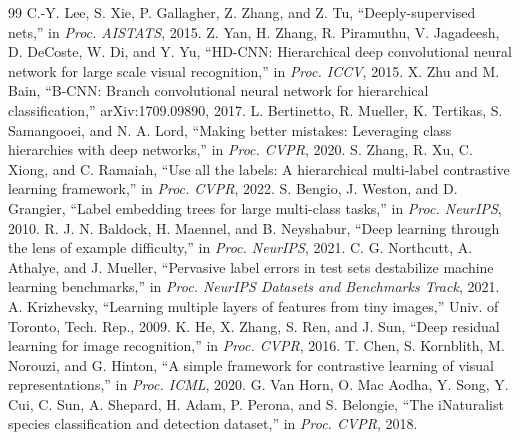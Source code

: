 \documentclass[conference]{IEEEtran}
\begin{document}
\begin{thebibliography}{99}
 C.-Y. Lee, S. Xie, P. Gallagher, Z. Zhang, and Z. Tu, ``Deeply-supervised nets,'' in \emph{Proc. AISTATS}, 2015.
 Z. Yan, H. Zhang, R. Piramuthu, V. Jagadeesh, D. DeCoste, W. Di, and Y. Yu, ``HD-CNN: Hierarchical deep convolutional neural network for large scale visual recognition,'' in \emph{Proc. ICCV}, 2015.
 X. Zhu and M. Bain, ``B-CNN: Branch convolutional neural network for hierarchical classification,'' arXiv:1709.09890, 2017.
 L. Bertinetto, R. Mueller, K. Tertikas, S. Samangooei, and N. A. Lord, ``Making better mistakes: Leveraging class hierarchies with deep networks,'' in \emph{Proc. CVPR}, 2020.
 S. Zhang, R. Xu, C. Xiong, and C. Ramaiah, ``Use all the labels: A hierarchical multi-label contrastive learning framework,'' in \emph{Proc. CVPR}, 2022.
 S. Bengio, J. Weston, and D. Grangier, ``Label embedding trees for large multi-class tasks,'' in \emph{Proc. NeurIPS}, 2010.
 R. J. N. Baldock, H. Maennel, and B. Neyshabur, ``Deep learning through the lens of example difficulty,'' in \emph{Proc. NeurIPS}, 2021.
 C. G. Northcutt, A. Athalye, and J. Mueller, ``Pervasive label errors in test sets destabilize machine learning benchmarks,'' in \emph{Proc. NeurIPS Datasets and Benchmarks Track}, 2021.
 A. Krizhevsky, ``Learning multiple layers of features from tiny images,'' Univ. of Toronto, Tech. Rep., 2009.
 K. He, X. Zhang, S. Ren, and J. Sun, ``Deep residual learning for image recognition,'' in \emph{Proc. CVPR}, 2016.
 T. Chen, S. Kornblith, M. Norouzi, and G. Hinton, ``A simple framework for contrastive learning of visual representations,'' in \emph{Proc. ICML}, 2020.
 G. Van Horn, O. Mac Aodha, Y. Song, Y. Cui, C. Sun, A. Shepard, H. Adam, P. Perona, and S. Belongie, ``The iNaturalist species classification and detection dataset,'' in \emph{Proc. CVPR}, 2018.
\end{thebibliography}
\end{document}
